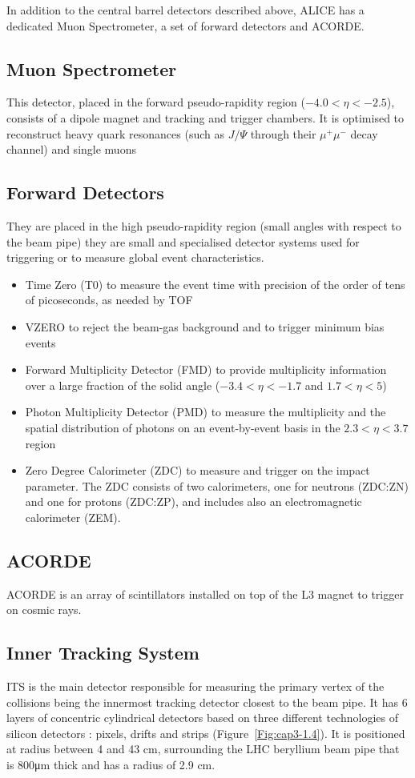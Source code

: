 In addition to the central barrel detectors described above, ALICE has a dedicated Muon Spectrometer, a set of forward detectors and ACORDE.

\subsection*{\textbf{Muon Spectrometer}}
This detector, placed in the forward pseudo-rapidity region ($-4.0 < \eta < -2.5$), consists of a dipole magnet and tracking and trigger chambers. It is optimised to reconstruct heavy quark resonances (such as $J/\Psi$ through their $\mu^{+}\mu^{-}$ decay channel) and single muons

\subsection*{\textbf{Forward Detectors}}
They are placed in the high pseudo-rapidity region (small angles with respect to the beam pipe) they are small and specialised detector systems used for triggering or to measure global event characteristics. 
\begin{itemize}
\item Time Zero (T$0$) to measure the event time with precision of the order of tens of picoseconds, as needed by TOF
\item VZERO to reject the beam-gas background and to trigger minimum bias events
\item Forward Multiplicity Detector (FMD) to provide multiplicity information over a large fraction of the solid angle ($-3.4 < \eta < -1.7$ and $1.7 < \eta < 5$)
\item Photon Multiplicity Detector (PMD) to measure the multiplicity and the spatial distribution of photons on an event-by-event basis in the $2.3 < \eta < 3.7$ region
\item Zero Degree Calorimeter (ZDC) to measure and trigger on the impact parameter. The ZDC consists of two calorimeters, one for neutrons (ZDC:ZN) and one for protons (ZDC:ZP), and includes also an electromagnetic calorimeter (ZEM).
\end{itemize}

\subsection*{\textbf{ACORDE}}
ACORDE is an array of scintillators installed on top of the L3 magnet to trigger on cosmic rays.


\subsection{Inner Tracking System}
\label{par:3.2a}
ITS is the main detector responsible for measuring the primary vertex of the collisions being the innermost tracking detector closest to the beam pipe. It has 6 layers of concentric cylindrical detectors based on three different technologies of silicon detectors : pixels, drifts and strips (\mbox{Figure \ref{Fig:cap3-1.4}}).  It is positioned at radius between 4 and 43 cm, surrounding the LHC beryllium beam pipe that is 800μm thick and has a radius of 2.9 cm. \\

